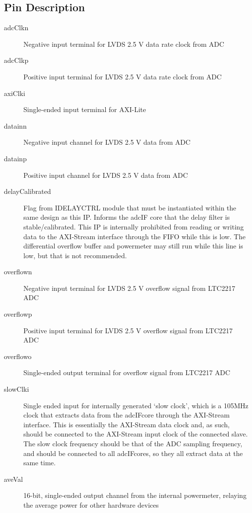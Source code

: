 \documentclass[11pt]{article}
\begin{document}
\subsection{Pin Description}
\begin{description}
	\item[adcClk\textunderscore n]Negative input terminal for LVDS 2.5 V data rate clock from ADC
	\item[adcClk\textunderscore p]Positive input terminal for LVDS 2.5 V data rate clock from ADC
	\item[axiClk\textunderscore i]Single-ended input terminal for AXI-Lite
	\item[data\textunderscore in\textunderscore n]Negative input channel for LVDS 2.5 V data from ADC
	\item[data\textunderscore in\textunderscore p]Positive input channel for LVDS 2.5 V data from ADC
	\item[delayCalibrated]Flag from IDELAYCTRL module that must be instantiated within the same design as this IP. Informs the adc\textunderscore IF
		\textunderscore core that the delay filter is stable/calibrated. This IP is internally prohibited from reading or writing data to the AXI-Stream
		interface through the FIFO while this is low. The differential overflow buffer and power\textunderscore meter may still run while this line is
		low, but that is not recommended.
	\item[overflow\textunderscore n]Negative input terminal for LVDS 2.5 V overflow signal from LTC2217 ADC
	\item[overflow\textunderscore p]Positive input terminal for LVDS 2.5 V overflow signal from LTC2217 ADC
	\item[overflow\textunderscore o]Single-ended output terminal for overflow signal from LTC2217 ADC
	\item[slowClk\textunderscore i]Single ended input for internally generated `slow clock', which is a 105MHz clock that extracts data from the
		adc\textunderscore IF\textunderscore core through the AXI-Stream interface. This is essentially the AXI-Stream data clock and, as such, should
		be connected to the AXI-Stream input clock of the connected slave. The slow clock frequency should be that of the ADC sampling frequency, and
		should be connected to all adc\textunderscore IF\textunderscore cores, so they all extract data at the same time.
	\item[aveVal]16-bit, single-ended output channel from the internal power\textunderscore meter, relaying the average power for other hardware devices

\end{description}
\end{document}
